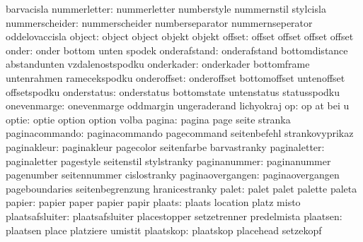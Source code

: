                        barvacisla
        nummerletter:  nummerletter         numberstyle          nummernstil
                       stylcisla
      nummerscheider:  nummerscheider       numberseparator      nummernseperator
                       oddelovaccisla
              object:  object               object               objekt
                       objekt
              offset:  offset               offset               offset
                       offset
               onder:  onder                bottom               unten
                       spodek
        onderafstand:  onderafstand         bottomdistance       abstandunten
                       vzdalenostspodku
          onderkader:  onderkader           bottomframe          untenrahmen
                       ramecekspodku
         onderoffset:  onderoffset          bottomoffset         untenoffset
                       offsetspodku
         onderstatus:  onderstatus          bottomstate          untenstatus
                       statusspodku
         onevenmarge:  onevenmarge          oddmargin            ungeraderand
                       lichyokraj
                  op:  op                   at                   bei
                       u %
               optie:  optie                option               option
                       volba
              pagina:  pagina               page                 seite
                       stranka
      paginacommando:  paginacommando       pagecommand          seitenbefehl
                       strankovyprikaz
         paginakleur:  paginakleur          pagecolor            seitenfarbe
                       barvastranky
        paginaletter:  paginaletter         pagestyle            seitenstil
                       stylstranky
        paginanummer:  paginanummer         pagenumber           seitennummer
                       cislostranky
    paginaovergangen:  paginaovergangen     pageboundaries       seitenbegrenzung
                       hranicestranky
               palet:  palet                palet                palette
                       paleta
              papier:  papier               paper                papier
                       papir
              plaats:  plaats               location             platz
                       misto
     plaatsafsluiter:  plaatsafsluiter      placestopper         setzetrenner
                       predelmista
            plaatsen:  plaatsen             place                platziere
                       umistit
           plaatskop:  plaatskop            placehead            setzekopf
